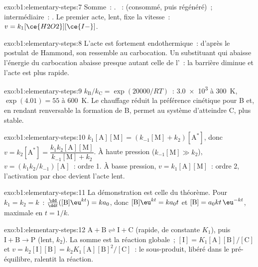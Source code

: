 \begin{solution}{exo:b1:elementary-steps:7}
Somme~: . ~:  (consommé, puis
régénéré)~; intermédiaire~: . Le premier acte, lent, fixe la
vitesse~: $v = k_1[\ce{H2O2}][\ce{I-}]$.
\end{solution}

\begin{solution}{exo:b1:elementary-steps:8}
L'acte est fortement endothermique~: d'après le postulat de Hammond, son
 ressemble au carbocation. Un substituant qui abaisse
l'énergie du carbocation abaisse presque autant celle de l'~: la barrière diminue et l'acte est plus rapide.
\end{solution}

\begin{solution}{exo:b1:elementary-steps:9}
$k_{\mathrm B}/k_{\mathrm C} = \exp(20000/RT)$~: \num{3.0e3} à
\qty{300}{K}, $\exp(4.01) = 55$ à \qty{600}{K}. Le chauffage réduit la
préférence cinétique pour B et, en rendant renversable la formation de
B, permet au système d'atteindre C, plus stable.
\end{solution}

\begin{solution}{exo:b1:elementary-steps:10}
$k_1[\mathrm{A}][\mathrm{M}] = (k_{-1}[\mathrm{M}] + k_2)[\mathrm{A}^*]$,
donc $v = k_2[\mathrm{A}^*] = \dfrac{k_1k_2[\mathrm{A}][\mathrm{M}]}{k_{-1}[\mathrm{M}]
+ k_2}$. À haute pression ($k_{-1}[\mathrm{M}] \gg k_2$), $v =
(k_1k_2/k_{-1})[\mathrm{A}]$~: ordre 1. À basse pression, $v =
k_1[\mathrm{A}][\mathrm{M}]$~: ordre 2, l'activation par choc devient
l'acte lent.
\end{solution}

\begin{solution}{exo:b1:elementary-steps:11}
La démonstration est celle du théorème. Pour $k_1 = k_2 = k$~:
$\frac{\dd}{\dd t}([\mathrm{B}]\eu^{kt}) = ka_0$, donc $[\mathrm{B}]\eu^{kt} =
ka_0t$ et $[\mathrm{B}] = a_0kt\,\eu^{-kt}$, maximale en $t = 1/k$.
\end{solution}

\begin{solution}{exo:b1:elementary-steps:12}
$\mathrm{A} + \mathrm{B} \rightleftharpoons \mathrm{I} + \mathrm{C}$
(rapide, de constante $K_1$), puis $\mathrm{I} + \mathrm{B} \to \mathrm{P}$
(lent,
$k_2$). La somme est la réaction globale~; $[\mathrm{I}] =
K_1[\mathrm{A}][\mathrm{B}]/[\mathrm{C}]$ et $v = k_2[\mathrm{I}][\mathrm{B}]
= k_2K_1[\mathrm{A}][\mathrm{B}]^2/[\mathrm{C}]$~: le sous-produit, libéré
dans le pré-équilibre, ralentit la réaction.
\end{solution}

